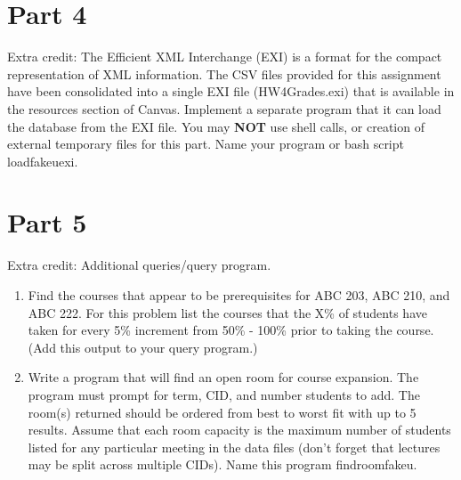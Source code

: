 \documentclass{article}
\begin{document}
\section*{Part 4}
Extra credit: The Efficient XML Interchange (EXI) is a format for the compact representation of XML information. 
The CSV files provided for this assignment have been consolidated into a single EXI file (HW4Grades.exi) that is available in the resources section of Canvas. 
Implement a separate program that it can load the database from the EXI file. 
You may {\bf NOT} use shell calls, or creation of external temporary files for this part.
Name your program or bash script loadfakeuexi.
\clearpage

\section*{Part 5}
Extra credit: Additional queries/query program.
\begin{enumerate}[label=\alph*.]
\item Find the courses that appear to be prerequisites for ABC 203, ABC 210, and ABC 222. For this problem list the courses that the X\% of students have taken for every 5\% increment from 50\% - 100\% prior to taking the course. (Add this output to your query program.)\\
 \clearpage
\item Write a program that will find an open room for course expansion. The program must prompt for term, CID, and number students to add. The room(s) returned should be ordered from best to worst fit with up to 5 results. Assume that each room capacity is the maximum number of students listed for any particular meeting in the data files (don't forget that lectures may be split across multiple CIDs). Name this program findroomfakeu.
 \clearpage
\end{enumerate}
\end{document}
